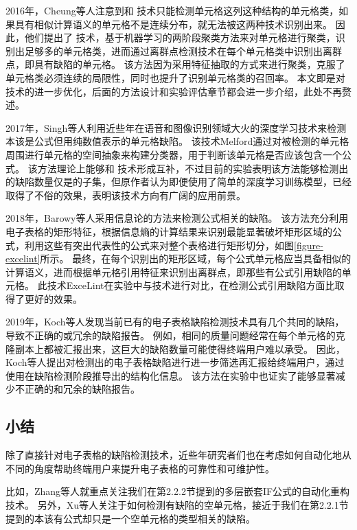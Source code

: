 2016年，Cheung等人\cite{cheung2016custodes}注意到\am 和 \ca 技术只能检测单元格这列这种结构的单元格类，如果具有相似计算语义的单元格不是连续分布，就无法被这两种技术识别出来。
因此，他们提出了 \cu 技术，基于机器学习的两阶段聚类方法来对单元格进行聚类，识别出足够多的单元格类，进而通过离群点检测技术在每个单元格类中识别出离群点，即具有缺陷的单元格。
该方法因为采用特征抽取的方式来进行聚类，克服了单元格类必须连续的局限性，同时也提升了识别单元格类的召回率。
本文即是对 \cu 技术的进一步优化，后面的方法设计和实验评估章节都会进一步介绍，此处不再赘述。



2017年，Singh等人\cite{singh2017melford}利用近些年在语音和图像识别领域大火的深度学习技术来检测本该是公式但用纯数值表示的单元格缺陷。
该技术Melford通过对被检测的单元格周围进行单元格的空间抽象来构建分类器，用于判断该单元格是否应该包含一个公式。
该方法理论上能够和 \cu 技术形成互补，不过目前的实验表明该方法能够检测出的缺陷数量仅是\cu 的子集，但原作者认为即便使用了简单的深度学习训练模型，已经取得了不俗的效果，表明该技术方向有广阔的应用前景。

2018年，Barowy等人\cite{Barowy2018excelint}采用信息论的方法来检测公式相关的缺陷。
该方法充分利用电子表格的矩形特征，根据信息熵的计算结果来识别最能显著破坏矩形区域的公式，利用这些有突出代表性的公式来对整个表格进行矩形切分，如图\ref{figure-excelint}所示。
最终，在每个识别出的矩形区域，每个公式单元格应当具备相似的计算语义，进而根据单元格引用特征来识别出离群点，即那些有公式引用缺陷的单元格。
此技术ExceLint在实验中\cite{Barowy2018excelint}与\cu 技术进行对比，在检测公式引用缺陷方面比\cu 取得了更好的效果。

2019年，Koch等人\cite{koch2019refinement}发现当前已有的电子表格缺陷检测技术具有几个共同的缺陷，导致不正确的或冗余的缺陷报告。
例如，相同的质量问题经常在每个单元格的克隆副本上都被汇报出来，这巨大的缺陷数量可能使得终端用户难以承受。
因此，Koch等人提出对检测出的电子表格缺陷进行进一步筛选再汇报给终端用户，通过使用在缺陷检测阶段推导出的结构化信息。
该方法在实验中也证实了能够显著减少不正确的和冗余的缺陷报告。

\subsection{小结}
除了直接针对电子表格的缺陷检测技术，近些年研究者们也在考虑如何自动化地从不同的角度帮助终端用户来提升电子表格的可靠性和可维护性。

比如，Zhang等人\cite{zhang2018automated}就重点关注我们在第2.2.2节提到的多层嵌套IF公式的自动化重构技术。
另外，Xu等人\cite{xu2018detecting}关注于如何检测有缺陷的空单元格，接近于我们在第2.2.1节提到的本该有公式却只是一个空单元格的类型相关的缺陷。




